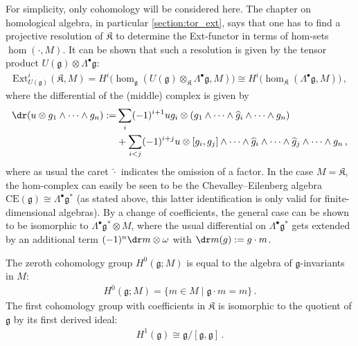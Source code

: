     For simplicity, only cohomology will be considered here. The chapter on homological algebra, in particular \cref{section:tor_ext}, says that one has to find a projective resolution of $\mathfrak{K}$ to determine the Ext-functor in terms of hom-sets $\hom(\cdot,M)$. It can be shown that such a resolution is given by the tensor product $U(\mathfrak{g})\otimes\Lambda^\bullet\mathfrak{g}$:
    \begin{gather}
        \mathrm{Ext}^i_{U(\mathfrak{g})}(\mathfrak{K},M) = H^i\bigl(\hom_{\mathfrak{g}}(U(\mathfrak{g})\otimes_{\mathfrak{K}}\Lambda^\bullet\mathfrak{g},M)\bigr)\cong H^i\bigl(\hom_{\mathfrak{K}}(\Lambda^\bullet\mathfrak{g},M)\bigr)\,,
    \end{gather}
    where the differential of the (middle) complex is given by
    \begin{align}
        \dr(u\otimes g_1\wedge\cdots\wedge g_n) := &\sum_i(-1)^{i+1}ug_i\otimes(g_1\wedge\cdots\wedge\widehat{g}_i\wedge\cdots\wedge g_n)\\
        &+\sum_{i<j}(-1)^{i+j}u\otimes[g_i,g_j]\wedge\cdots\wedge\widehat{g}_i\wedge\cdots\wedge\widehat{g}_j\wedge\cdots\wedge g_n\,,\nonumber
    \end{align}
    where as usual the caret $\widehat\cdot$ indicates the omission of a factor. In the case $M=\mathfrak{K}$, the hom-complex can easily be seen to be the Chevalley--Eilenberg algebra $\mathrm{CE}(\mathfrak{g})\cong\Lambda^\bullet\mathfrak{g}^*$ (as stated above, this latter identification is only valid for finite-dimensional algebras). By a change of coefficients, the general case can be shown to be isomorphic to $\Lambda^\bullet\mathfrak{g}^*\otimes M$, where the usual differential on $\Lambda^\bullet\mathfrak{g}^*$ gets extended by an additional term $(-1)^n\dr m\otimes\omega$ with $\dr m(g):=g\cdot m$.

    \begin{property}[$H^0$ and $H^1$]
        The zeroth cohomology group $H^0(\mathfrak{g};M)$ is equal to the algebra of $\mathfrak{g}$-invariants in $M$:
        \begin{gather}
            \label{lie:zeroth_cohomology}
            H^0(\mathfrak{g};M) = \{m\in M\mid\mathfrak{g}\cdot m = m\}\,.
        \end{gather}
        The first cohomology group with coefficients in $\mathfrak{K}$ is isomorphic to the quotient of $\mathfrak{g}$ by its first derived ideal:
        \begin{gather}
            H^1(\mathfrak{g})\cong\mathfrak{g}/[\mathfrak{g},\mathfrak{g}]\,.
        \end{gather}
    \end{property}

